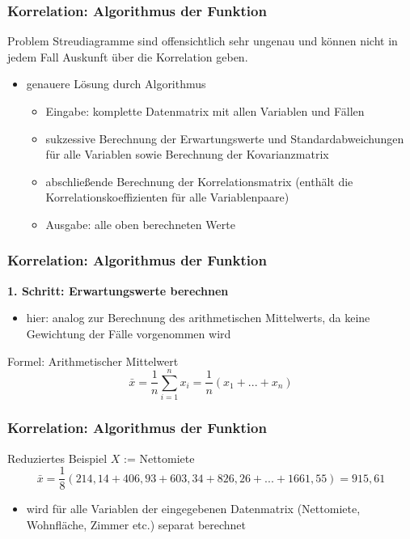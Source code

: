\documentclass{beamer}
\begin{document}
\begin{frame}
	\frametitle{Korrelation: Algorithmus der Funktion}

	\begin{block}{Problem}
		Streudiagramme sind offensichtlich sehr ungenau und können nicht in jedem Fall Auskunft über die Korrelation geben.
	\end{block}

	\begin{itemize}
		\item genauere Lösung durch Algorithmus
		\begin{itemize}
			\item Eingabe: komplette Datenmatrix mit allen Variablen und Fällen
			\item sukzessive Berechnung der Erwartungswerte und Standardabweichungen für alle Variablen sowie Berechnung der Kovarianzmatrix
			\item abschließende Berechnung der Korrelationsmatrix (enthält die Korrelationskoeffizienten für alle Variablenpaare)
			\item Ausgabe: alle oben berechneten Werte
		\end{itemize}
	\end{itemize}
\end{frame}

\begin{frame}
	\frametitle{Korrelation: Algorithmus der Funktion}

	\par \textbf{1. Schritt: Erwartungswerte berechnen}\\[3mm]
	
	\begin{itemize}
		\item hier: analog zur Berechnung des arithmetischen Mittelwerts, da keine Gewichtung der Fälle vorgenommen wird
	\end{itemize}
	
	\begin{block}{Formel: Arithmetischer Mittelwert}
		\begin{equation*}
			\bar{x}=\dfrac{1}{n}\sum_{i=1}^{n}{x_i}=\dfrac{1}{n}(x_1+...+x_n)
		\end{equation*}
	\end{block}
\end{frame}

\begin{frame}
	\frametitle{Korrelation: Algorithmus der Funktion}

	\begin{block}{Reduziertes Beispiel}
	  $X$ := Nettomiete
		\begin{equation*}
			\bar{x}=\dfrac{1}{8}(214,14+406,93+603,34+826,26+...+1661,55)=915,61
		\end{equation*}
	\end{block}
	
	\begin{itemize}
		\item wird für alle Variablen der eingegebenen Datenmatrix (Nettomiete, Wohnfläche, Zimmer etc.) separat berechnet
	\end{itemize}
\end{frame}
\end{document}
